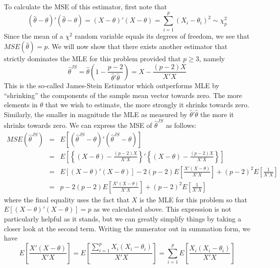 To calculate the MSE of this estimator, first note that
\begin{equation*}
  \left( \hat{\theta} - \theta \right)' \left( \hat{\theta}- \theta \right) = \left( X - \theta \right)'\left( X-\theta \right)= \sum_{i = 1}^{p} \left( X_{i} - \theta_i \right)^2 \sim \chi^2_p 
\end{equation*}
Since the mean of a $\chi^2$ random variable equals its degrees of freedom, we see that $MSE(\hat{\theta})=p$.
We will now show that there exists another estimator that strictly dominates the MLE for this problem provided that $p \geq 3$, namely
\begin{equation*}
  \hat{\theta}^{JS} = \hat{\theta}\left( 1 - \frac{p-2}{\hat{\theta}'\hat{\theta}} \right) = X - \frac{\left( p-2 \right)X}{X'X}
\end{equation*}
This is the so-called James-Stein Estimator which outperforms MLE by ``shrinking'' the components of the sample mean vector towards zero.
The more elements in $\theta$ that we wish to estimate, the more strongly it shrinks towards zero.
Similarly, the smaller in magnitude the MLE as measured by $\hat{\theta}'\hat{\theta}$ the more it shrinks towards zero.
We can express the MSE of $\hat{\theta}^{JS}$ as follows:
\begin{eqnarray*}
  MSE\left( \hat{\theta}^{JS} \right) &=& E\left[ \left( \hat{\theta}^{JS} - \theta \right)'\left( \hat{\theta}^{JS} - \theta \right) \right]\\
  &=& E\left[ \left\{ \left( X - \theta \right) - \frac{(p-2)X}{X'X} \right\}' \left\{ \left( X - \theta \right) - \frac{(p-2)X}{X'X} \right\} \right]  \\
  &=&E\left[ \left( X - \theta \right)'\left( X - \theta \right) \right] - 2 (p-2)E\left[ \frac{X'(X-\theta)}{X'X} \right] + \left( p-2 \right)^{2} E\left[ \frac{1}{X'X} \right] \\
  &=& p - 2 (p-2)E\left[ \frac{X'(X-\theta)}{X'X} \right] + \left( p-2 \right)^{2} E\left[ \frac{1}{X'X} \right]
\end{eqnarray*}
where the final equality uses the fact that $X$ is the MLE for this problem so that $E\left[ \left( X - \theta \right)'\left( X - \theta \right) \right]=p$ as we calculated above. 
This expression is not particularly helpful as it stands, but we can greatly simplify things by taking a closer look at the second term.
Writing the numerator out in summation form, we have
\begin{equation*}
  E\left[ \frac{X'(X-\theta)}{X'X} \right] = E\left[ \frac{\sum_{i=1}^{p} X_i\left( X_i - \theta_i \right)}{X'X} \right] = \sum_{i=1}^{p} E\left[ \frac{X_i(X_i - \theta_i)}{X'X} \right]
\end{equation*}
